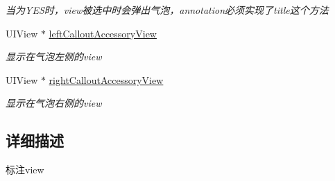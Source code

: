 \begin{DoxyCompactItemize}
\begin{DoxyCompactList}\small\item\em 当为\-Y\-E\-S时，view被选中时会弹出气泡，annotation必须实现了title这个方法 \end{DoxyCompactList}\item 
\hypertarget{interface_b_m_k_annotation_view_ae182c0fb7dc1898c4941a123def7f926}{U\-I\-View $\ast$ \hyperlink{interface_b_m_k_annotation_view_ae182c0fb7dc1898c4941a123def7f926}{left\-Callout\-Accessory\-View}}\label{interface_b_m_k_annotation_view_ae182c0fb7dc1898c4941a123def7f926}

\begin{DoxyCompactList}\small\item\em 显示在气泡左侧的view \end{DoxyCompactList}\item 
\hypertarget{interface_b_m_k_annotation_view_a65793288845c27e23233373b3e6b6216}{U\-I\-View $\ast$ \hyperlink{interface_b_m_k_annotation_view_a65793288845c27e23233373b3e6b6216}{right\-Callout\-Accessory\-View}}\label{interface_b_m_k_annotation_view_a65793288845c27e23233373b3e6b6216}

\begin{DoxyCompactList}\small\item\em 显示在气泡右侧的view \end{DoxyCompactList}\end{DoxyCompactItemize}


\subsection{详细描述}
标注view 

